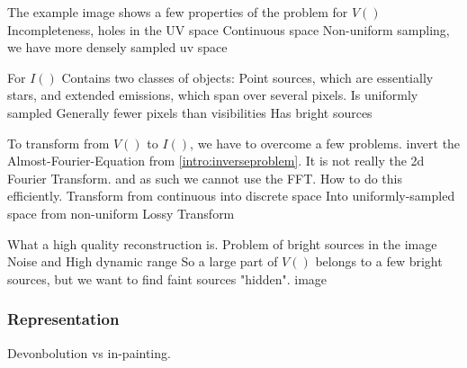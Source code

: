 The example image shows a few properties of the problem
for $V()$
Incompleteness, holes in the UV space
Continuous space
Non-uniform sampling, we have more densely sampled uv space

For $I()$
Contains two classes of objects: Point sources, which are essentially stars, and extended emissions, which span over several pixels.
Is uniformly sampled
Generally fewer pixels than visibilities
Has bright sources

To transform from $V()$ to $I()$, we have to overcome a few problems.
invert the Almost-Fourier-Equation from \eqref{intro:inverseproblem}. It is not really the 2d Fourier Transform. and as such we cannot use the FFT. How to do this efficiently.
Transform from continuous into discrete space
Into uniformly-sampled space from non-uniform
Lossy Transform


What a high quality reconstruction is. Problem of bright sources in the image
Noise and High dynamic range
So a large part of $V()$ belongs to a few bright sources, but we want to find faint sources "hidden".
image 


\subsubsection{Representation}
Devonbolution vs in-painting.

